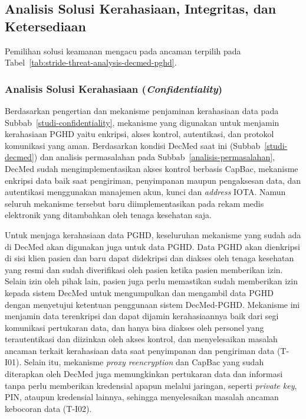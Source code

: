 
\subsection{Analisis Solusi Kerahasiaan, Integritas, dan Ketersediaan}\label{alternatif-analisis-solusi-cia}

Pemilihan solusi keamanan mengacu pada ancaman terpilih pada Tabel~\ref{tab:stride-threat-analysis-decmed-pghd}.

\subsubsection{Analisis Solusi Kerahasiaan (\textit{Confidentiality})}

Berdasarkan pengertian dan mekanisme penjaminan kerahasiaan data pada Subbab~\ref{studi-confidentiality}, mekanisme yang digunakan untuk menjamin kerahasiaan PGHD yaitu enkripsi, akses kontrol, autentikasi, dan protokol komunikasi yang aman. 
Berdasarkan kondisi DecMed saat ini (Subbab~\ref{studi-decmed}) dan analisis permasalahan pada Subbab~\ref{analisis-permasalahan}, DecMed sudah mengimplementasikan akses kontrol berbasis CapBac, mekanisme enkripsi data baik saat pengiriman, penyimpanan maupun pengaksesan data, dan autentikasi menggunakan manajemen akun, kunci dan \textit{address} IOTA\@.
Namun seluruh mekanisme tersebut baru diimplementasikan pada rekam medis elektronik yang ditambahkan oleh tenaga kesehatan saja.

Untuk menjaga kerahasiaan data PGHD, keseluruhan mekanisme yang sudah ada di DecMed akan digunakan juga untuk data PGHD\@.
Data PGHD akan dienkripsi di sisi klien pasien dan baru dapat didekripsi dan diakses oleh tenaga kesehatan yang resmi dan sudah diverifikasi oleh pasien ketika pasien memberikan izin.
Selain izin oleh pihak lain, pasien juga perlu memastikan sudah memberikan izin kepada sistem DecMed untuk mengumpulkan dan mengambil data PGHD dengan menyetujui ketentuan penggunaan sistem DecMed-PGHD\@.
Mekanisme ini menjamin data terenkripsi dan dapat dijamin kerahasiaannya baik dari segi komunikasi pertukaran data, dan hanya bisa diakses oleh personel yang terautentikasi dan diizinkan oleh akses kontrol, dan menyelesaikan masalah ancaman terkait kerahasiaan data saat penyimpanan dan pengiriman data (T-I01).
Selain itu, mekanisme \textit{proxy reencryption} dan CapBac yang sudah diterapkan oleh DecMed juga memungkinkan pertukaran data dan informasi tanpa perlu memberikan kredensial apapun melalui jaringan, seperti \textit{private key}, PIN, ataupun kredensial lainnya, sehingga menyelesaikan masalah ancaman kebocoran data (T-I02).

